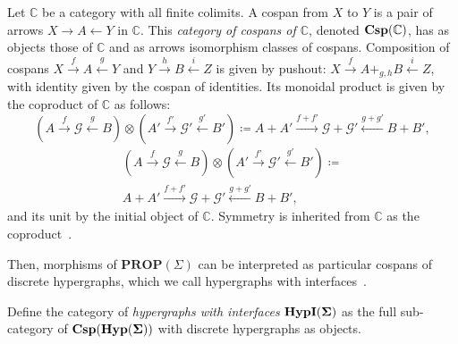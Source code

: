 \begin{definition}
Let $\mathbb{C}$ be a category with all finite colimits.  A cospan from $X$ to $Y$ is a pair of arrows $X \xrightarrow{} A \xleftarrow{} Y$  in $\mathbb{C}$.  This \textit{category of cospans of $\mathbb{C}$},  denoted $\mathbf{Csp(\mathbb{C})}$,  has as objects those of $\mathbb{C}$ and as arrows isomorphism classes of cospans.
Composition of cospans $X \xrightarrow{f} A \xleftarrow{g} Y$ and $Y \xrightarrow{h} B \xleftarrow{i} Z$ is given by pushout: $X \xrightarrow{f} A +_{g,h} B \xleftarrow{i} Z$,  with identity given by the cospan of identities.  Its monoidal product is given by the coproduct of $\mathbb{C}$ as follows: 
\ifdefined \ONECOLUMN
\[
    (A \xrightarrow{f} \mathcal{G} \xleftarrow{g} B) \otimes (A' \xrightarrow{f'} \mathcal{G'} \xleftarrow{g'} B') \coloneq A + A' \xrightarrow{f+f'} \mathcal{G} + \mathcal{G'} \xleftarrow{g+g'} B + B'  ,
\]
\else
\begin{multline*}
    (A \xrightarrow{f} \mathcal{G} \xleftarrow{g} B) \otimes (A' \xrightarrow{f'} \mathcal{G'} \xleftarrow{g'} B') \coloneq\\ A + A' \xrightarrow{f+f'} \mathcal{G} + \mathcal{G'} \xleftarrow{g+g'} B + B'  , 
\end{multline*}
\fi
and its unit by the initial object of $\mathbb{C}$.
Symmetry is inherited from $\mathbb{C}$ as the coproduct~\cite{MonoidalCoproduct}.
\end{definition}


Then, morphisms of $\textbf{PROP}(\Sigma)$ can be interpreted as particular cospans of discrete hypergraphs,  which we call hypergraphs with interfaces~\cite{bonchi_string_2022-2}.
\begin{definition}
\label{def:cspd}
Define the category of \emph{hypergraphs with interfaces} $\mathbf{HypI(\Sigma)}$ as the full sub-category of $\mathbf{Csp(Hyp(\Sigma))}$ with discrete hypergraphs as objects.
\end{definition}

